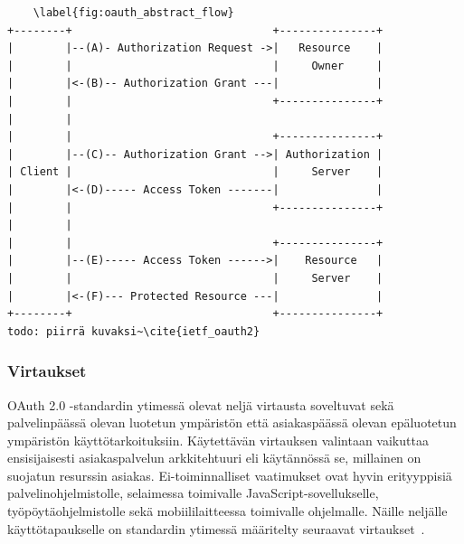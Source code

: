 \documentclass[finnish,gradu]{tktltiki}
\begin{document}
  \begin{singlespacing}
  \begin{verbatim}
    \label{fig:oauth_abstract_flow}
+--------+                               +---------------+
|        |--(A)- Authorization Request ->|   Resource    |
|        |                               |     Owner     |
|        |<-(B)-- Authorization Grant ---|               |
|        |                               +---------------+
|        |
|        |                               +---------------+
|        |--(C)-- Authorization Grant -->| Authorization |
| Client |                               |     Server    |
|        |<-(D)----- Access Token -------|               |
|        |                               +---------------+
|        |
|        |                               +---------------+
|        |--(E)----- Access Token ------>|    Resource   |
|        |                               |     Server    |
|        |<-(F)--- Protected Resource ---|               |
+--------+                               +---------------+
todo: piirrä kuvaksi~\cite{ietf_oauth2}
  \end{verbatim}
  \end{singlespacing}




  \subsubsection{Virtaukset} %
  \label{ssub:virtaukset}

  OAuth 2.0 -standardin ytimessä olevat neljä virtausta soveltuvat sekä palvelinpäässä olevan luotetun ympäristön että asiakaspäässä olevan epäluotetun ympäristön käyttötarkoituksiin. Käytettävän virtauksen valintaan vaikuttaa ensisijaisesti asiakaspalvelun arkkitehtuuri eli käytännössä se, millainen on suojatun resurssin asiakas. Ei-toiminnalliset vaatimukset ovat hyvin erityyppisiä palvelinohjelmistolle, selaimessa toimivalle JavaScript-sovellukselle, työpöytäohjelmistolle sekä mobiililaitteessa toimivalle ohjelmalle. Näille neljälle käyttötapaukselle on standardin ytimessä määritelty seuraavat virtaukset~\cite{ietf_oauth2}.
\end{document}
